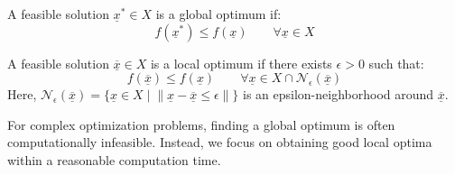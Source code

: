 \begin{definition}
    A feasible solution $\underline{x}^\ast\in X$ is a global optimum if:
    \[f (\underline{x}^\ast) \leq f (\underline{x}) \qquad\forall\underline{x}\in X\]
\end{definition}
\begin{definition}
    A feasible solution $\underline{\overline{x}} \in X$ is a local optimum if there exists $\epsilon > 0$ such that:
    \[f (\underline{\overline{x}}) \leq f (\underline{x}) \qquad\forall\underline{x} \in X \cap \mathcal{N}_\epsilon(\underline{\overline{x}})\]
    Here, $\mathcal{N}_\epsilon(\underline{\overline{x}}) = \{\underline{x} \in X \mid \left\lVert \underline{x}-\underline{\overline{x}}\leq \epsilon\right\rVert \}$ is an epsilon-neighborhood around $\underline{\overline{x}}$.
\end{definition}
For complex optimization problems, finding a global optimum is often computationally infeasible. 
Instead, we focus on obtaining good local optima within a reasonable computation time.